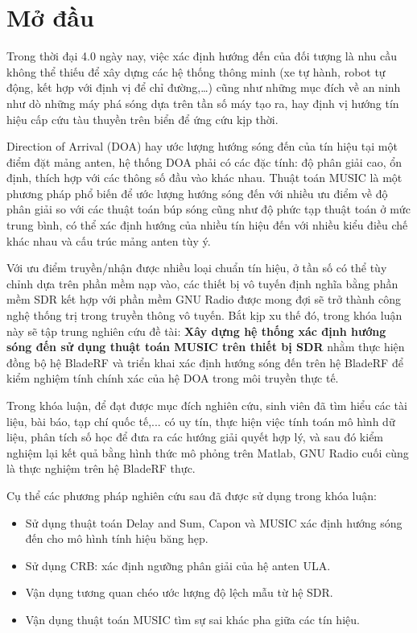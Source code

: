 \chapter*{Mở đầu}

Trong thời đại 4.0 ngày nay, việc xác định hướng đến của đối tượng là nhu cầu không thể thiếu để xây dựng các hệ thống thông minh (xe tự hành, robot tự động, kết hợp với định vị để chỉ đường,…) cũng như những mục đích về an ninh như dò những máy phá sóng dựa trên tần số máy tạo ra, hay định vị hướng tín hiệu cấp cứu tàu thuyền trên biển để ứng cứu kịp thời.

Direction of Arrival (DOA) hay ước lượng hướng sóng đến của tín hiệu tại một điểm đặt mảng anten, hệ thống DOA phải có các đặc tính: độ phân giải cao, ổn định, thích hợp với các thông số đầu vào khác nhau. Thuật toán MUSIC là một phương pháp phổ biến để ước lượng hướng sóng đến với nhiều ưu điểm về độ phân giải so với các thuật toán búp sóng cũng như độ phức tạp thuật toán ở mức trung bình, có thể xác định hướng của nhiều tín hiệu đến với nhiều kiểu điều chế khác nhau và cấu trúc mảng anten tùy ý.

Với ưu điểm truyền/nhận được nhiều loại chuẩn tín hiệu, ở tần số có thể tùy chỉnh dựa trên phần mềm nạp vào, các thiết bị vô tuyến định nghĩa bằng phần mềm SDR kết hợp với phần mềm GNU Radio được mong đợi sẽ trở thành công nghệ thống trị trong truyền thông vô tuyến. Bắt kịp xu thế đó, trong khóa luận này sẽ tập trung nghiên cứu đề tài: \textbf{Xây dựng hệ thống xác định hướng sóng đến sử dụng thuật toán MUSIC trên thiết bị SDR} nhằm thực hiện đồng bộ hệ BladeRF và triển khai xác định hướng sóng đến trên hệ BladeRF để kiểm nghiệm tính chính xác của hệ DOA trong môi truyền thực tế.
\vspace{0.5cm}


Trong khóa luận, để đạt được mục đích nghiên cứu, sinh viên đã tìm
hiểu các tài liệu, bài báo, tạp chí quốc tế,... có uy tín, thực hiện việc tính toán mô hình dữ liệu, phân tích số học để đưa ra các hướng giải quyết hợp lý, và sau đó kiểm nghiệm lại kết quả bằng hình thức mô phỏng trên Matlab, GNU Radio cuối cùng là thực nghiệm trên hệ BladeRF thực.

Cụ thể các phương pháp nghiên cứu sau đã được sử dụng trong khóa luận:

\renewcommand{\labelitemi}{$-$}
\begin{itemize}
	\item Sử dụng thuật toán Delay and Sum, Capon và MUSIC xác định hướng sóng đến cho mô hình tính hiệu băng hẹp.
	\item Sử dụng CRB: xác định ngưỡng phân giải của hệ anten ULA.
	\item Vận dụng tương quan chéo ước lượng độ lệch mẫu từ hệ SDR.
	\item Vận dụng thuật toán MUSIC tìm sự sai khác pha giữa các tín hiệu.
\end{itemize} 
\vspace{0.3cm}


